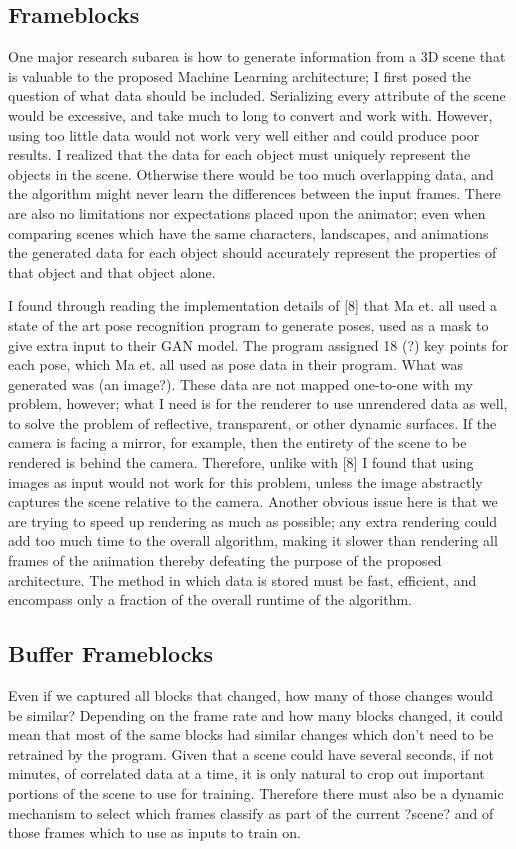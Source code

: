 \documentclass[conference]{IEEEtran}
\begin{document}
\subsection{Frameblocks}
\label{ref:subsection_ref}
One major research subarea is how to generate information from a 3D scene that is valuable to the proposed Machine Learning architecture;
I first posed the question of what data should be included.
Serializing every attribute of the scene would be excessive,
and take much to long to convert and work with.
However, using too little data would not work very well either and could produce poor results.
I realized that the data for each object must uniquely represent the objects in the scene.
Otherwise there would be too much overlapping data,
and the algorithm might never learn the differences between the input frames.
There are also no limitations nor expectations placed upon the animator;
even when comparing scenes which have the same characters, landscapes, and animations
the generated data for each object should accurately represent the properties of that object and that object alone.

I found through reading the implementation details of [8] that Ma et. all
used a state of the art pose recognition program to generate poses,
used as a mask to give extra input to their GAN model.
The program assigned 18 (?) key points for each pose,
which Ma et. all used as pose data in their program.
What was generated was (an image?).
These data are not mapped one-to-one with my problem, however;
what I need is for the renderer to use unrendered data as well,
to solve the problem of reflective, transparent, or other dynamic surfaces.
If the camera is facing a mirror, for example,
then the entirety of the scene to be rendered is behind the camera.
Therefore, unlike with [8] I found that using images as input would not work for this problem,
unless the image abstractly captures the scene relative to the camera.
Another obvious issue here is that we are trying to speed up rendering as much as possible;
any extra rendering could add too much time to the overall algorithm,
making it slower than rendering all frames of the animation thereby defeating the purpose of the proposed architecture.
The method in which data is stored must be fast, efficient, and encompass only a fraction of the overall runtime of the algorithm.

\subsection{Buffer Frameblocks}
\label{subsec:buffer_frameblocks}
Even if we captured all blocks that changed, how many of those changes would be similar?
Depending on the frame rate and how many blocks changed,
it could mean that most of the same blocks had similar changes which don't need to be retrained by the program.
Given that a scene could have several seconds, if not minutes, of correlated data at a time,
it is only natural to crop out important portions of the scene to use for training.
Therefore there must also be a dynamic mechanism to select which frames classify as part of the current ?scene? and of those frames which to use as inputs to train on.
\end{document}
